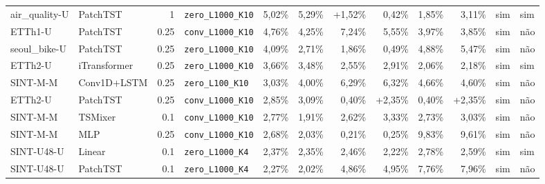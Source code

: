 \begin{longtable}{llrlrrrrrrll}
air\_quality-U & PatchTST & 1 & \texttt{zero\_\allowbreak{}L1000\_\allowbreak{}K10} & \textminus{}5,02\% & \textminus{}5,29\% & +1,52\% & \textminus{}0,42\% & \textminus{}1,85\% & \textminus{}3,11\% & sim & sim \\
ETTh1-U & PatchTST & 0.25 & \texttt{conv\_\allowbreak{}L1000\_\allowbreak{}K10} & \textminus{}4,76\% & \textminus{}4,25\% & \textminus{}7,24\% & \textminus{}5,55\% & \textminus{}3,97\% & \textminus{}3,85\% & sim & n\~ao \\
seoul\_bike-U & PatchTST & 0.25 & \texttt{zero\_\allowbreak{}L1000\_\allowbreak{}K10} & \textminus{}4,09\% & \textminus{}2,71\% & \textminus{}1,86\% & \textminus{}0,49\% & \textminus{}4,88\% & \textminus{}5,47\% & sim & n\~ao \\
ETTh2-U & iTransformer & 0.25 & \texttt{zero\_\allowbreak{}L1000\_\allowbreak{}K10} & \textminus{}3,66\% & \textminus{}3,48\% & \textminus{}2,55\% & \textminus{}2,91\% & \textminus{}2,06\% & \textminus{}2,18\% & sim & sim \\
SINT-M-M & Conv1D+LSTM & 0.25 & \texttt{zero\_\allowbreak{}L100\_\allowbreak{}K10} & \textminus{}3,03\% & \textminus{}4,00\% & \textminus{}6,29\% & \textminus{}6,32\% & \textminus{}4,66\% & \textminus{}4,60\% & sim & n\~ao \\
ETTh2-U & PatchTST & 0.25 & \texttt{conv\_\allowbreak{}L1000\_\allowbreak{}K10} & \textminus{}2,85\% & \textminus{}3,09\% & \textminus{}0,40\% & +2,35\% & \textminus{}0,40\% & +2,35\% & sim & n\~ao \\
SINT-M-M & TSMixer & 0.1 & \texttt{conv\_\allowbreak{}L1000\_\allowbreak{}K10} & \textminus{}2,77\% & \textminus{}1,91\% & \textminus{}2,62\% & \textminus{}3,33\% & \textminus{}2,73\% & \textminus{}3,03\% & sim & n\~ao \\
SINT-M-M & MLP & 0.25 & \texttt{conv\_\allowbreak{}L1000\_\allowbreak{}K10} & \textminus{}2,68\% & \textminus{}2,03\% & \textminus{}0,21\% & \textminus{}0,25\% & \textminus{}9,83\% & \textminus{}9,61\% & sim & n\~ao \\
SINT-U48-U & Linear & 0.1 & \texttt{zero\_\allowbreak{}L1000\_\allowbreak{}K4} & \textminus{}2,37\% & \textminus{}2,35\% & \textminus{}2,46\% & \textminus{}2,22\% & \textminus{}2,78\% & \textminus{}2,59\% & sim & sim \\
SINT-U48-U & PatchTST & 0.1 & \texttt{zero\_\allowbreak{}L1000\_\allowbreak{}K4} & \textminus{}2,27\% & \textminus{}2,02\% & \textminus{}4,86\% & \textminus{}4,95\% & \textminus{}7,76\% & \textminus{}7,96\% & sim & n\~ao \\

\end{longtable}
